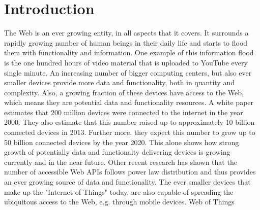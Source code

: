 
\chapter{Introduction}




The Web is an ever growing entity, in all aspects that it covers.
It surrounds a rapidly growing number of human beings in their daily life and starts to flood them with functionality and information.
One example of this information flood is the one hundred hours of video material that is uploaded to \textrm{YouTube\cite{wwwYoutube}} every single minute.
An increasing number of bigger computing centers, but also ever smaller devices provide more data and functionality, both in quantity and complexity.
Also, a growing fraction of these devices have access to the Web, which means they are potential data and functionality resources.
A white paper\cite{citeulike:12243016} estimates that 200 million devices were connected to the internet in the year 2000.
They also estimate that this number raised up to approximately 10 billion connected devices in 2013.
Further more, they expect this number to grow up to 50 billion connected devices by the year 2020.
This alone shows how strong growth of potentially data and functionalty delivering devices is growing currently and in the near future.
Other recent research\cite{conf/icws/HuangFT12}\cite{wwwProgrammableWebResearch} has shown that the number of accessible Web APIs follows power law distribution and thus provides an ever growing source of data and functionality.
The ever smaller devices that make up the "Internet of Things"\cite{Weber2010} today, are also capable of spreading the ubiquitous access to the Web, e.g. through mobile devices.
\textrm{Web of Things}~\cite{Guinard2011WoT}

